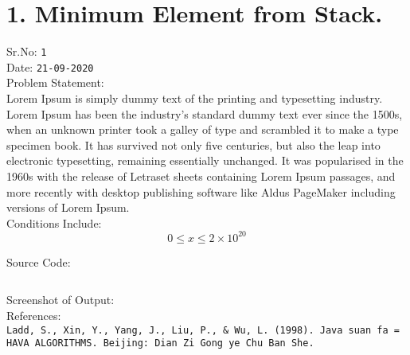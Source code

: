 \documentclass[12pt,a4paper]{report}
\begin{document}
\newpage
\section*{1. Minimum Element from Stack.}
\begin{flushleft}
Sr.No: \texttt{1}\\
\vspace{10px}
Date: \texttt{21-09-2020}\\
\vspace{10px}
Problem Statement:\\
Lorem Ipsum is simply dummy text of the printing and typesetting industry. Lorem Ipsum has been the industry's standard dummy text ever since the 1500s, when an unknown printer took a galley of type and scrambled it to make a type specimen book. It has survived not only five centuries, but also the leap into electronic typesetting, remaining essentially unchanged. It was popularised in the 1960s with the release of Letraset sheets containing Lorem Ipsum passages, and more recently with desktop publishing software like Aldus PageMaker including versions of Lorem Ipsum.\\
\vspace{15px}
Conditions Include:\\

$$0 \leq x \le 2\times10^{20}$$

\vspace{10px}
Source Code:\\
\inputminted[tabsize=2,breaklines]{python}{code_1.py}

\vspace{10px}
Screenshot of Output:\\

\vspace{10px}
References:\\
\texttt{Ladd, S., Xin, Y., Yang, J., Liu, P., \& Wu, L. (1998). Java suan fa = HAVA ALGORITHMS. Beijing: Dian Zi Gong ye Chu Ban She.}

\end{flushleft}
\end{document}
